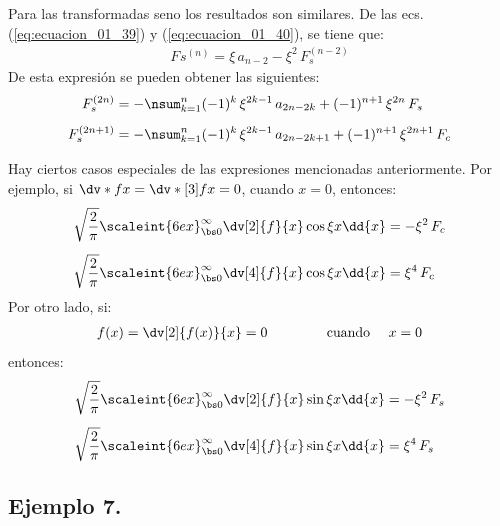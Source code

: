 Para las transformadas seno los resultados son similares. De las ecs. (\ref{eq:ecuacion_01_39}) y (\ref{eq:ecuacion_01_40}), se tiene que:
\begin{align*}
F_{}s^{(n)} = \xi \, a_{n-2} - \xi^{2} \, F_{s}^{(n-2)}
\end{align*}
De esta expresión se pueden obtener las siguientes:
\begin{align}
F_{s}^{(2n)} &= - \nsum_{k=1}^{n} (-1)^{k} \, \xi^{2k-1} \, a_{2n-2k} + (-1)^{n+1} \, \xi^{2n} \, F_{s} \label{eq:ecuacion_01_43} \\[0.5em]
F_{s}^{(2n+1)} &= - \nsum_{k=1}^{n} (-1)^{k} \, \xi^{2k-1} \, a_{2n-2k+1} + (-1)^{n+1} \, \xi^{2n+1} \, F_{c} \label{eq:ecuacion_01_44}
\end{align}

Hay ciertos casos especiales de las expresiones mencionadas anteriormente. Por ejemplo, si $\dv*{f}{x} = \dv*[3]{f}{x} = 0$, cuando $x = 0$, entonces:
\begin{align*}
\sqrt{\dfrac{2}{\pi}} \scaleint{6ex}_{\bs 0}^{\infty} \dv[2]{f}{x} \cos \xi x \dd{x} &= - \xi^{2} \, F_{c} \\[0.5em]
\sqrt{\dfrac{2}{\pi}} \scaleint{6ex}_{\bs 0}^{\infty} \dv[4]{f}{x} \cos \xi x \dd{x} &= \xi^{4} \, F_{c}
\end{align*}
Por otro lado, si:
\begin{align*}
f (x) = \dv[2]{f (x)}{x} = 0 \hspace{1.5cm} \mbox{cuando \quad} x = 0
\end{align*}
entonces:
\begin{align*}
\sqrt{\dfrac{2}{\pi}} \scaleint{6ex}_{\bs 0}^{\infty} \dv[2]{f}{x} \sin \xi x \dd{x} &= - \xi^{2} \, F_{s} \\[0.5em]
\sqrt{\dfrac{2}{\pi}} \scaleint{6ex}_{\bs 0}^{\infty} \dv[4]{f}{x} \sin \xi x \dd{x} &= \xi^{4} \, F_{s}
\end{align*}

\subsection*{Ejemplo 7.}

